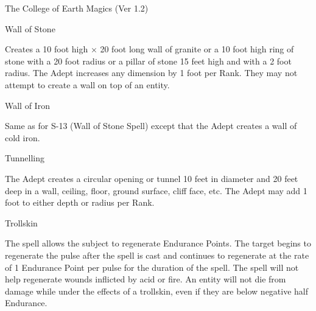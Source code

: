 \begin{Chapter}{The College of Earth Magics (Ver 1.2)}
\begin{spell}[S-13]{Wall of Stone }
\begin{effects}
Creates a 10 foot high × 20 foot long wall of granite or a 10 foot
high ring of stone with a 20 foot radius or a pillar of stone 15 feet
high and with a 2 foot radius. The Adept increases any dimension by 1
foot per Rank. They may not attempt to create a wall on top of an
entity.
\end{effects}
\end{spell}

\begin{spell}[S-14]{Wall of Iron }

\begin{effects}
Same as for S-13 (Wall of Stone Spell) except that the Adept creates a
wall of cold iron.
\end{effects}
\end{spell}

\begin{spell}[S-15]{Tunnelling }

\begin{effects}
The Adept creates a circular opening or tunnel 10 feet in diameter and
20 feet deep in a wall, ceiling, floor, ground surface, cliff face,
etc.  The Adept may add 1 foot to either depth or radius per Rank.
\end{effects}
\end{spell}

\begin{spell}[S-16]{Trollskin }

\begin{effects}
The spell allows the subject to regenerate Endurance Points.  The
target begins to regenerate the pulse after the spell is cast and
continues to regenerate at the rate of 1 Endurance Point per pulse for
the duration of the spell.  The spell will not help regenerate wounds
inflicted by acid or fire.  An entity will not die from damage while
under the effects of a trollskin, even if they are below negative half
Endurance.
\end{effects}
\end{spell}


\end{Chapter}
